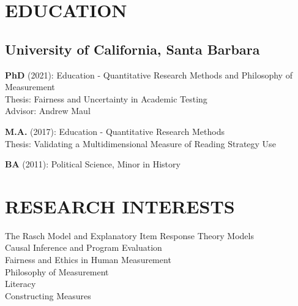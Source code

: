 \documentclass[12pt, oneside,]{memoir}
\begin{document}
\thispagestyle{headers}

\hypertarget{education}{%
\section{EDUCATION}\label{education}}
\hypertarget{university-of-california-santa-barbara}{%
\subsection{University of California, Santa
Barbara}\label{university-of-california-santa-barbara}}
\noindent\textbf{PhD} (2021): Education - Quantitative Research Methods and
Philosophy of Measurement\\
\hspace*{0.333em}\hspace*{0.333em}Thesis: Fairness and Uncertainty in
Academic Testing\\
\hspace*{0.333em}\hspace*{0.333em}Advisor: Andrew Maul

\noindent \textbf{M.A.} (2017): Education - Quantitative Research Methods\\
\hspace*{0.333em}\hspace*{0.333em}Thesis: Validating a Multidimensional
Measure of Reading Strategy Use
\vspace{2mm}

\noindent \textbf{BA} (2011): Political Science, Minor in History
\vspace{4mm}

\hypertarget{research-interests}{%
\section{RESEARCH INTERESTS}\label{research-interests}}
\noindent\hspace*{0.333em} The Rasch Model and Explanatory Item Response Theory Models\\
\hspace*{0.333em} Causal Inference and Program Evaluation\\
\hspace*{0.333em} Fairness and Ethics in Human Measurement\\
\hspace*{0.333em} Philosophy of Measurement\\
\hspace*{0.333em} Literacy\\
\hspace*{0.333em} Constructing Measures\\
\vspace{2mm}
\end{document}

